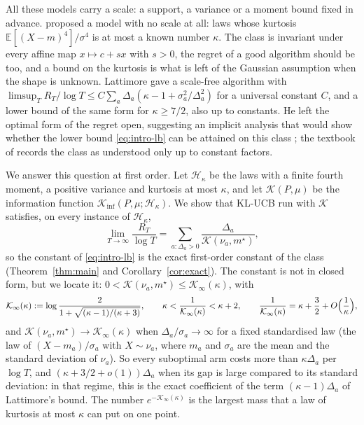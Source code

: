 \documentclass[11pt]{article}
\newcommand{\E}{\mathbb{E}}
\begin{document}
All these models carry a scale: a support, a variance or a moment bound fixed in advance. \citet{L17}
proposed a model with no scale at all: laws whose kurtosis
$\E[(X-m)^4]/\sigma^4$ is at most a known number $\kappa$. The class is invariant under every affine map
$x\mapsto c+sx$ with $s>0$, the regret of a good algorithm should be too, and a bound on the kurtosis is
what is left of the Gaussian assumption when the shape is unknown. Lattimore gave a scale-free algorithm
with $\limsup_TR_T/\log T\le C\sum_a\Delta_a(\kappa-1+\sigma_a^2/\Delta_a^2)$ for a universal constant $C$,
and a lower bound of the same form for $\kappa\ge7/2$, also up to constants. He left the optimal form of
the regret open, suggesting an implicit analysis that would show whether the lower bound
\eqref{eq:intro-lb} can be attained on this class \citep[Section~4]{L17}; the textbook of
\citet[Section~16.4]{LS} records the class as understood only up to constant factors.

We answer this question at first order. Let $\mathcal H_\kappa$ be the laws with a finite fourth moment, a
positive variance and kurtosis at most $\kappa$, and let $\mathcal K(P,\mu)$ be the information function
$\mathcal{K}_{\inf}(P,\mu;\mathcal H_\kappa)$. We show that KL-UCB run with $\mathcal K$ satisfies, on every
instance of $\mathcal H_\kappa$,
\begin{equation}\label{eq:intro-main}
  \lim_{T\to\infty}\frac{R_T}{\log T}=\sum_{a:\Delta_a>0}\frac{\Delta_a}{\mathcal K(\nu_a,m^\star)},
\end{equation}
so the constant of \eqref{eq:intro-lb} is the exact first-order constant of the class (Theorem~\ref{thm:main} and
Corollary~\ref{cor:exact}). The constant is
not in closed form, but we locate it: $0<\mathcal K(\nu_a,m^\star)\le\mathcal K_\infty(\kappa)$, with
\begin{equation}\label{eq:intro-kinfty}
  \mathcal K_\infty(\kappa):=\log\frac{2}{1+\sqrt{(\kappa-1)/(\kappa+3)}},\qquad
  \kappa<\frac1{\mathcal K_\infty(\kappa)}<\kappa+2,\qquad
  \frac1{\mathcal K_\infty(\kappa)}=\kappa+\frac32+O\Bigl(\frac1\kappa\Bigr),
\end{equation}
and $\mathcal K(\nu_a,m^\star)\to\mathcal K_\infty(\kappa)$ when $\Delta_a/\sigma_a\to\infty$ for a fixed standardised law
(the law of $(X-m_a)/\sigma_a$ with $X\sim\nu_a$, where $m_a$ and $\sigma_a$ are the mean and the standard deviation of
$\nu_a$). So every suboptimal
arm costs more than $\kappa\Delta_a$ per $\log T$, and $(\kappa+3/2+o(1))\Delta_a$ when its gap is large
compared to its standard deviation: in that regime, this is the exact coefficient of the term
$(\kappa-1)\Delta_a$ of Lattimore's bound. The number $e^{-\mathcal K_\infty(\kappa)}$ is the largest mass that
a law of kurtosis at most $\kappa$ can put on one point.
\end{document}
